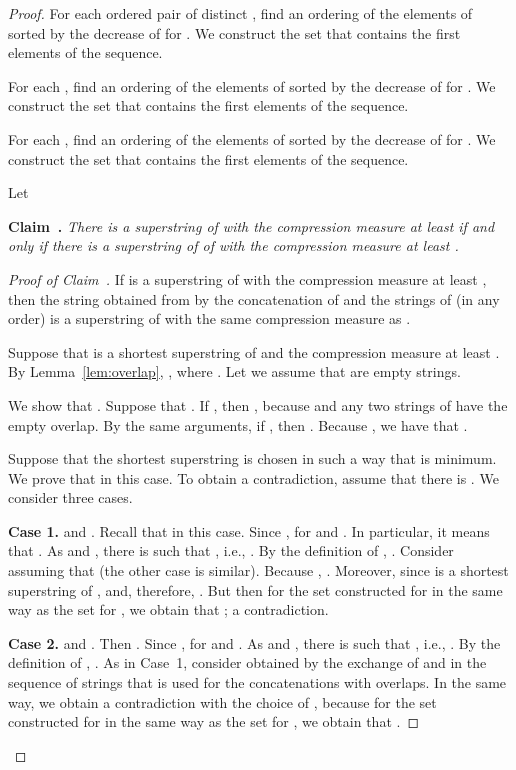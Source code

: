 \documentclass[11pt]{article}
\begin{document}
\begin{proof}
For each ordered pair  of distinct , find an ordering  of the elements of  sorted by the decrease of  for . We construct the set  that contains the first  elements of the sequence.

For each , find an ordering  of the elements of  sorted by the decrease of  for . We construct the set  that contains the first  elements of the sequence.

For each , find an ordering  of the elements of  sorted by the decrease of  for . We construct the set  that contains the first  elements of the sequence.

Let 

\medskip
\noindent
{\bf Claim~.} {\it There is a superstring  of  with the compression measure at least  if and only if there is a superstring  of of  with the compression measure at least . }

\begin{proof}[Proof of Claim~]
If  is a superstring of  with the compression measure at least , then the string  obtained from  by the concatenation of  and the strings of  (in any order) is a superstring of  with the same compression measure as .

Suppose that  is a shortest superstring of  and the compression measure  at least . By Lemma~\ref{lem:overlap}, , where .
Let  
we assume that  are empty strings. 

We show that . Suppose that . If , then , because  and any two strings of  have the empty overlap.
By the same arguments, if   , then . Because , we have that .

Suppose that the shortest superstring  is chosen in such a way that  is minimum. We prove that  in this case.
To obtain a contradiction, assume that there is . We consider three cases.

\medskip
\noindent
{\bf Case 1.}  and . Recall that  in this case. Since ,  for  and .
In particular, it means that . As  and , there is  such that , i.e., . By the definition of , .  Consider 
 assuming that  (the other case is similar). Because 
, . Moreover, since  is a shortest superstring of , 
 and, therefore, . But then for  the set  constructed for  in the same way as the set  for , we obtain that 
; a contradiction.


\medskip
\noindent
{\bf Case 2.}  and . Then .
 Since ,  for  and . 
As  and , there is  such that , i.e., 
. By the definition of ,
.  
As in Case~1, consider  obtained by the exchange of  and  in the sequence of strings that is used for the concatenations with overlaps.   
In the same way, we obtain a contradiction with the choice of , because for  the set  constructed for  in the same way as the set  for , we obtain that 
.


\end{proof}
\end{proof}
\end{document}

